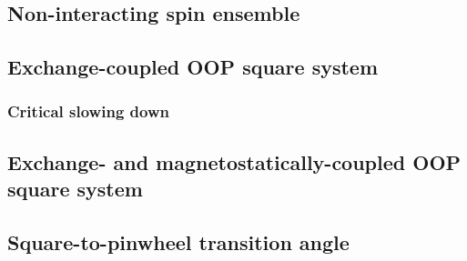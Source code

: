 \subsection{Non-interacting spin ensemble}
\subsection{Exchange-coupled OOP square system}
\subsubsection{Critical slowing down}
\subsection{Exchange- and magnetostatically-coupled OOP square system}
\subsection{Square-to-pinwheel transition angle}
